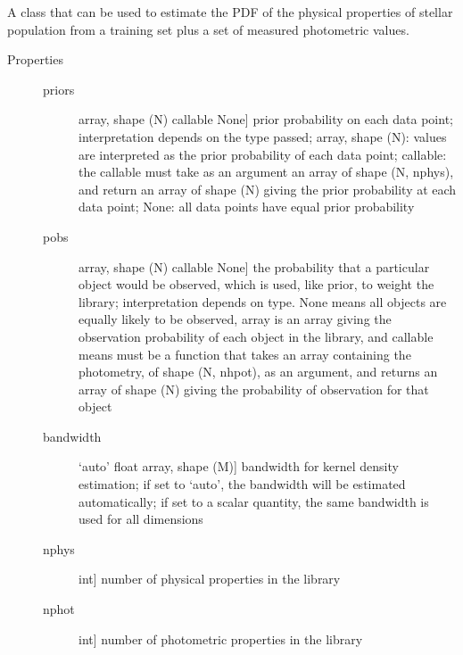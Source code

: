 \documentclass[letterpaper,10pt,english]{sphinxmanual}
\begin{document}
\begin{fulllineitems}
\label{bayesphot:slugpy.bayesphot.bp.bp}
A class that can be used to estimate the PDF of the physical
properties of stellar population from a training set plus a set of
measured photometric values.
\begin{description}
\item[{Properties}] \leavevmode\begin{description}
\item[{priors}] \leavevmode{[}array, shape (N) \textbar{} callable \textbar{} None{]}
prior probability on each data point; interpretation
depends on the type passed; array, shape (N): values are
interpreted as the prior probability of each data point;
callable: the callable must take as an argument an array
of shape (N, nphys), and return an array of shape (N)
giving the prior probability at each data point; None:
all data points have equal prior probability

\item[{pobs}] \leavevmode{[}array, shape (N) \textbar{} callable \textbar{} None{]}
the probability that a particular object would be observed,
which is used, like prior, to weight the library;
interpretation depends on type. None means all objects are
equally likely to be observed, array is an array giving the
observation probability of each object in the library, and
callable means must be a function that takes an array
containing the photometry, of shape (N, nhpot), as an
argument, and returns an array of shape (N) giving the
probability of observation for that object

\item[{bandwidth}] \leavevmode{[}`auto' \textbar{} float \textbar{} array, shape (M){]}
bandwidth for kernel density estimation; if set to
`auto', the bandwidth will be estimated automatically; if
set to a scalar quantity, the same bandwidth is used for all
dimensions

\item[{nphys}] \leavevmode{[}int{]}
number of physical properties in the library

\item[{nphot}] \leavevmode{[}int{]}
number of photometric properties in the library


\end{description}
\end{description}
\end{fulllineitems}
\end{document}
